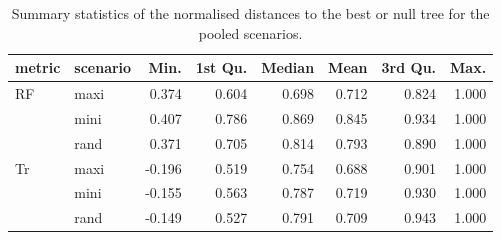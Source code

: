 \begin{table}[ht]
\centering
\begin{tabular}{llrrrrrr}
  \hline
metric & scenario & Min. & 1st Qu. & Median & Mean & 3rd Qu. & Max. \\ 
  \hline
RF & maxi & 0.374 & 0.604 & 0.698 & 0.712 & 0.824 & 1.000 \\ 
   & mini & 0.407 & 0.786 & 0.869 & 0.845 & 0.934 & 1.000 \\ 
   & rand & 0.371 & 0.705 & 0.814 & 0.793 & 0.890 & 1.000 \\ 
  Tr & maxi & -0.196 & 0.519 & 0.754 & 0.688 & 0.901 & 1.000 \\ 
   & mini & -0.155 & 0.563 & 0.787 & 0.719 & 0.930 & 1.000 \\ 
   & rand & -0.149 & 0.527 & 0.791 & 0.709 & 0.943 & 1.000 \\ 
   \hline
\end{tabular}
\caption{Summary statistics of the normalised distances to the best or null tree for the pooled scenarios.} 
\label{Tab_pooledscenarios}
\end{table}
